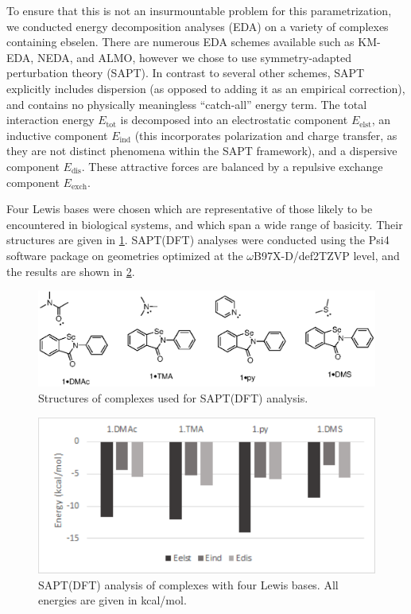 \begin{refsection}
To ensure that this is not an insurmountable problem for this parametrization, we conducted energy decomposition analyses (EDA) on a variety of complexes containing ebselen.
There are numerous EDA schemes available such as KM-EDA, NEDA, and ALMO, however we chose to use symmetry-adapted perturbation theory (SAPT).\autocite{SAPT2020,Jeziorski1994PerturbationComplexes}
In contrast to several other schemes, SAPT explicitly includes dispersion (as opposed to adding it as an empirical correction), and contains no physically meaningless ``catch-all'' energy term.
The total interaction energy $E_\mathrm{tot}$ is decomposed into an electrostatic component $E_\mathrm{elst}$, an inductive component $E_\mathrm{ind}$ (this incorporates polarization and charge transfer, as they are not distinct phenomena within the SAPT framework), and a dispersive component $E_\mathrm{dis}$.
These attractive forces are balanced by a repulsive exchange component $E_\mathrm{exch}$.

Four Lewis bases were chosen which are representative of those likely to be encountered in biological systems, and which span a wide range of basicity.
Their structures are given in \cref{fig:complexes}.
SAPT(DFT) analyses were conducted using the Psi4 software package on geometries optimized at the $\omega$B97X-D/def2TZVP level, and the results are shown in \cref{fig:eda}.\autocite{Parrish2017}

\begin{figure}
    \centering
    \includegraphics[scale=0.74]{Figures/sapt-complexes.eps}
    \caption{Structures of complexes used for SAPT(DFT) analysis.}
    \label{fig:complexes}
\end{figure}

\begin{figure}
    \centering
    \includegraphics[width=0.5\linewidth]{Figures/sapt-eda.pdf}
    \caption{SAPT(DFT) analysis of complexes with four Lewis bases. All energies are given in kcal/mol.}
    \label{fig:eda}
\end{figure}


\end{refsection}
